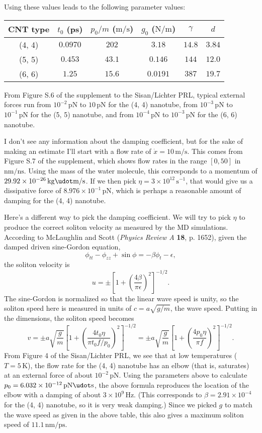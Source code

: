 \documentclass[11pt]{article}
\begin{document}
Using these values leads to the following parameter values:
\begin{center}
\begin{tabular}{cccccc}
CNT type & $t_0$ (ps) & $p_0/m$ ($\text{m}/\text{s}$) & $g_0$ ($\text{N}/\text{m}$) & $\gamma$ & $d$ \\\hline
(4, 4) & $0.0970$ & $202$ & $3.18$ & $14.8$ & $3.84$ \\
(5, 5) & $0.453$ & $43.1$ & $0.146$ & $144$ & $12.0$ \\
(6, 6) & $1.25$ & $15.6$ & $0.0191$ & $387$ & $19.7$
\end{tabular}
\end{center}

From Figure S.6 of the supplement to the Sisan/Lichter PRL, typical external forces run from $10^{-2}\,\text{pN}$ to $10\,\text{pN}$ for the (4, 4) nanotube, from $10^{-3}\,\text{pN}$ to $10^{-1}\,\text{pN}$ for the (5, 5) nanotube, and from $10^{-4}\,\text{pN}$ to $10^{-3}\,\text{pN}$ for the (6, 6) nanotube.

I don't see any information about the damping coefficient, but for the sake of making an estimate I'll start with a flow rate of $\dot{x}=10\,\text{m}/\text{s}$. This comes from Figure S.7 of the supplement, which shows flow rates in the range $[0, 50]$ in $\text{nm}/\text{ns}$. Using the mass of the water molecule, this corresponds to a momentum of $29.92\times10^{-26}\,\text{kg}\udot\text{m}/\text{s}$. If we then pick $\eta=3\times10^{12}\,\text{s}^{-1}$, that would give us a dissipative force of $8.976\times10^{-1}\,\text{pN}$, which is perhaps a reasonable amount of damping for the (4, 4) nanotube.

Here's a different way to pick the damping coefficient. We will try to pick $\eta$ to produce the correct soliton velocity as measured by the MD simulations. According to McLaughlin and Scott (\textit{Physics Review A} \textbf{18}, p. 1652), given the damped driven sine-Gordon equation,
\[
\phi_{tt}-\phi_{zz}+\sin\phi=-\beta\phi_t-\epsilon,
\]
the soliton velocity is
\[
u=\pm\left[1+\left(\frac{4\beta}{\pi\epsilon}\right)^2\right]^{-1/2}.
\]
The sine-Gordon is normalized so that the linear wave speed is unity, so the soliton speed here is measured in units of $c=a\sqrt{g/m}$, the wave speed. Putting in the dimensions, the soliton speed becomes
\[
v=\pm a\sqrt{\frac{g}{m}}
	\left[1+\left(\frac{4t_0\eta}{\pi t_0 f/p_0}\right)^2\right]^{-1/2}
	=\pm a\sqrt{\frac{g}{m}}
	\left[1+\left(\frac{4p_0\eta}{\pi f}\right)^2\right]^{-1/2}.
\]
From Figure 4 of the Sisan/Lichter PRL, we see that at low temperatures ($T=5\,\text{K}$), the flow rate for the (4, 4) nanotube has an elbow (that is, saturates) at an external force of about $10^{-2}\,\text{pN}$. Using the parameters above to calculate $p_0=6.032\times10^{-12}\,\text{pN}\udot\text{s}$,  the above formula reproduces the location of the elbow with a damping of about $3\times10^{9}\,\text{Hz}$. (This corresponds to $\beta=2.91\times10^{-4}$ for the (4, 4) nanotube, so it is very weak damping.) Since we picked $g$ to match the wave speed as given in the above table, this also gives a maximum soliton speed of $11.1\,\text{nm}/\text{ps}$.
\end{document}
